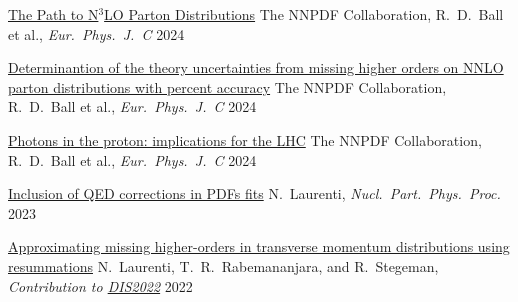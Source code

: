 
\begin{cvhonors}

    
    \cvhonor
    {\href{https://arxiv.org/pdf/2402.18635.pdf}{The Path to N$^3$LO Parton Distributions}} %
    {The NNPDF Collaboration, R.\ D.\ Ball et al., \emph{Eur.\ Phys.\ J.\ C}} %
    {}
    {2024}
    
    \cvhonor
    {\href{https://arxiv.org/pdf/2401.10319.pdf}{Determinantion of the theory uncertainties from missing higher orders on NNLO parton distributions with percent accuracy}} %
    {The NNPDF Collaboration, R.\ D.\ Ball et al., \emph{Eur.\ Phys.\ J.\ C}} %
    {}
    {\vspace{0.35cm}2024}
    
    \cvhonor
    {\href{https://arxiv.org/pdf/2401.08749.pdf}{Photons in the proton: implications for the LHC}} %
    {The NNPDF Collaboration, R.\ D.\ Ball et al., \emph{Eur.\ Phys.\ J.\ C}} %
    {}
    {2024}

    \cvhonor
    {\href{https://doi.org/10.1016/j.nuclphysbps.2023.11.013}{Inclusion of QED corrections in PDFs ﬁts}}
    {N.\ Laurenti, \textit{Nucl.\ Part.\ Phys.\ Proc.}}
    {}
    {2023}
    
    \cvhonor
    {\href{https://arxiv.org/abs/2207.12265}{Approximating missing higher-orders in transverse momentum distributions using resummations}}
    {N.~Laurenti, T.\ R.\ Rabemananjara, and R.\ Stegeman, \emph{Contribution to \href{https://inspirehep.net/conferences/1914506?ui-citation-summary=true}{DIS2022}}}
    {}
    {\vspace{0.35cm}2022}

\end{cvhonors}